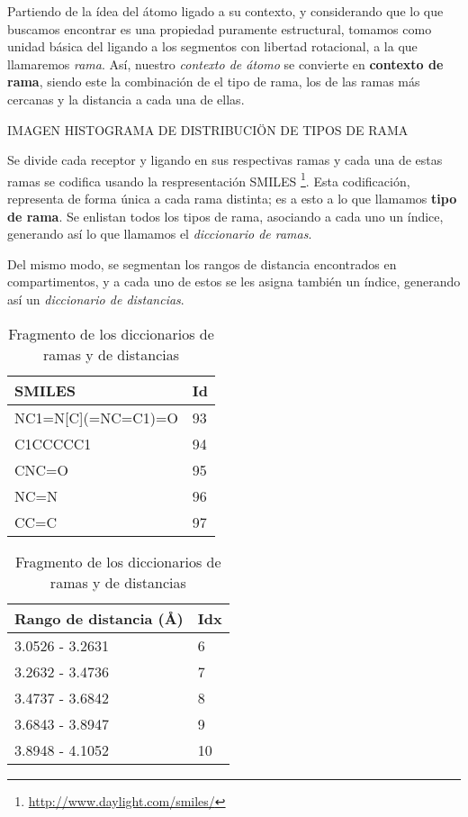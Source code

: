 Partiendo de la ídea del átomo ligado a su contexto, y considerando
que lo que buscamos encontrar es una propiedad puramente estructural,
tomamos como unidad básica del ligando a los segmentos con libertad
rotacional, a la que llamaremos \textit{rama}. Así, nuestro
\textit{contexto de átomo} se convierte en \textbf{contexto de rama},
siendo este la combinación de el tipo de rama, los de las ramas más
cercanas y la distancia a cada una de ellas.

IMAGEN HISTOGRAMA DE DISTRIBUCIÖN DE TIPOS DE RAMA

Se divide cada receptor y ligando en sus respectivas ramas y cada una
de estas ramas se codifica usando la respresentación
SMILES \footnote{\url{http://www.daylight.com/smiles/}}. Esta
codificación, representa de forma única a cada rama distinta; es a
esto a lo que llamamos \textbf{tipo de rama}. Se enlistan todos los
tipos de rama, asociando a cada uno un índice, generando así lo que
llamamos el \textit{diccionario de ramas}.

Del mismo modo, se segmentan los rangos de distancia encontrados en
compartimentos, y a cada uno de estos se les asigna también un índice,
generando así un \textit{diccionario de distancias}.

\begin{table}[H]
  \begin{center}
    \begin{tabular}{l|l}
      SMILES                 & Id \\ \hline
      NC1=N{[}C{]}(=NC=C1)=O & 93 \\
      C1CCCCC1               & 94 \\
      CNC=O                  & 95 \\
      NC=N                   & 96 \\
      CC=C                   & 97
    \end{tabular}
    \begin{tabular}{l|l}
      Rango de distancia (\AA) & Idx \\ \hline
      3.0526 - 3.2631        & 6   \\
      3.2632 - 3.4736        & 7   \\
      3.4737 - 3.6842        & 8   \\
      3.6843 - 3.8947        & 9   \\
      3.8948 - 4.1052        & 10
    \end{tabular}
  \end{center}
  \caption{Fragmento de los diccionarios de ramas y de distancias}
  \label{fig:dictionary}
\end{table}

